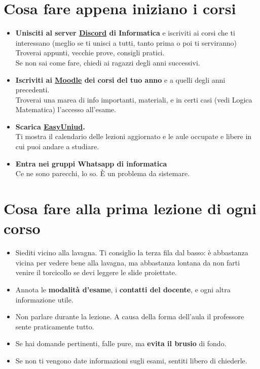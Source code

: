 \documentclass[18pt]{extarticle}
\begin{document}
\section{Cosa fare appena iniziano i corsi}
\begin{itemize}
\item \textbf{Unisciti al server \href{https://discord.com/invite/pHHv6TE8WW}{Discord} di Informatica} e iscriviti ai corsi che ti interessano (meglio se ti unisci a tutti, tanto prima o poi ti serviranno)\\
  Troverai appunti, vecchie prove, consigli pratici.\\
  Se non sai come fare, chiedi ai ragazzi degli anni successivi.
\item \textbf{Iscriviti ai \href{https://elearning.uniud.it/moodle/login/index.php}{Moodle} dei corsi del tuo anno} e a quelli degli anni precedenti.\\
  Troverai una marea di info importanti, materiali, e in certi casi (vedi Logica Matematica) l'accesso all'esame.
\item \textbf{Scarica \href{https://play.google.com/store/apps/details?id=it.easystaff.uniud&hl=it}{EasyUniud}.}\\
  Ti mostra il calendario delle lezioni aggiornato e le aule occupate e libere in cui puoi andare a studiare.
\item \textbf{Entra nei gruppi Whatsapp di informatica}\\
Ce ne sono parecchi, lo so. È un problema da sistemare. 
\end{itemize}


\section{Cosa fare alla prima lezione di ogni corso}
\begin{itemize}
\item Siediti vicino alla lavagna. Ti consiglio la terza fila dal basso: è abbastanza vicina per vedere bene alla lavagna, ma abbastanza lontana da non farti venire il torcicollo se devi leggere le slide proiettate.
\item Annota le \textbf{modalità d'esame}, i \textbf{contatti del docente}, e ogni altra informazione utile.
\item Non parlare durante la lezione. A causa della forma dell'aula il professore sente praticamente tutto.
\item Se hai domande pertinenti, falle pure, ma \textbf{evita il brusio} di fondo.
\item Se non ti vengono date informazioni sugli esami, sentiti libero di chiederle.
\end{itemize}
\end{document}
